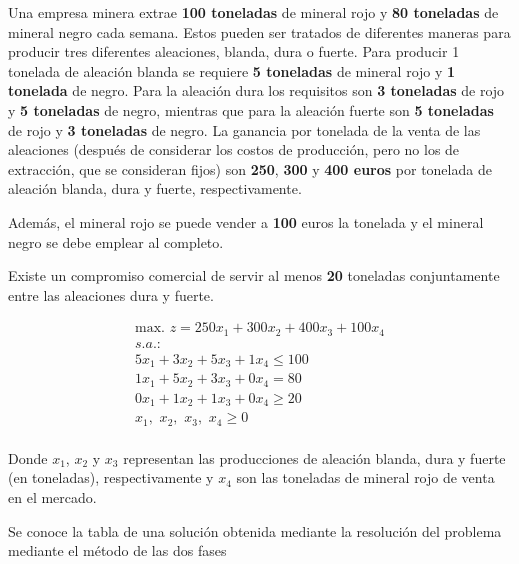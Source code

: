 Una empresa minera extrae \textbf{100 toneladas} de mineral rojo y \textbf{80 toneladas} de mineral negro cada semana. Estos pueden ser tratados de diferentes maneras para producir tres diferentes aleaciones, blanda, dura o fuerte. Para producir 1 tonelada de aleación blanda se requiere \textbf{5 toneladas} de mineral rojo y \textbf{1 tonelada} de negro. Para la aleación dura los requisitos son \textbf{3 toneladas} de rojo y \textbf{5 toneladas} de negro, mientras que para la aleación fuerte son \textbf{5 toneladas} de rojo y \textbf{3 toneladas} de negro. La ganancia por tonelada de la venta de las aleaciones (después de considerar los costos de producción, pero no los de extracción, que se consideran fijos) son \textbf{250}, \textbf{300} y \textbf{400 euros} por tonelada de aleación blanda, dura y fuerte, respectivamente.

Además, el mineral rojo se puede vender a \textbf{100} euros la tonelada y el mineral negro se debe emplear al completo.

Existe un compromiso comercial de servir al menos \textbf{20} toneladas conjuntamente entre las aleaciones dura y fuerte.

\begin{equation}
\begin{split}
\mbox{max. } z = 250x_1 + 300x_2 + 400x_3 + 100x_4\\
s.a.:\\
5x_1 + 3x_2 + 5x_3 + 1x_4 \leq 100\\
1x_1 + 5x_2 + 3x_3 + 0x_4 = 80\\
0x_1 + 1x_2 + 1x_3 + 0x_4 \geq 20\\
x_1,\,\,x_2,\,\,x_3,\,\,x_4\geq 0\\
\end{split}
\end{equation}

Donde $x_1$, $x_2$ y $x_3$ representan las producciones de aleación blanda, dura y fuerte (en toneladas), respectivamente y $x_4$ son las toneladas de mineral rojo de venta en el mercado.

Se conoce la tabla de una solución obtenida mediante la resolución del problema mediante el método de las dos fases


